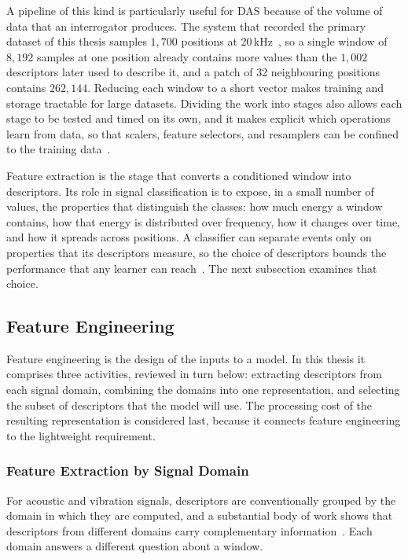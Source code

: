 A pipeline of this kind is particularly useful for DAS because of the volume of data that an interrogator produces. The system that recorded the primary dataset of this thesis samples $1{,}700$ positions at 20\,kHz~\cite{tomasov2025dataset}, so a single window of $8{,}192$ samples at one position already contains more values than the $1{,}002$ descriptors later used to describe it, and a patch of 32 neighbouring positions contains $262{,}144$. Reducing each window to a short vector makes training and storage tractable for large datasets. Dividing the work into stages also allows each stage to be tested and timed on its own, and it makes explicit which operations learn from data, so that scalers, feature selectors, and resamplers can be confined to the training data~\cite{kapoor2023leakage}.

Feature extraction is the stage that converts a conditioned window into descriptors. Its role in signal classification is to expose, in a small number of values, the properties that distinguish the classes: how much energy a window contains, how that energy is distributed over frequency, how it changes over time, and how it spreads across positions. A classifier can separate events only on properties that its descriptors measure, so the choice of descriptors bounds the performance that any learner can reach~\cite{guyon2003variable,sharma2020audio}. The next subsection examines that choice.

\subsection{Feature Engineering}
\label{sec:chap2FeatureEngineering}
Feature engineering is the design of the inputs to a model. In this thesis it comprises three activities, reviewed in turn below: extracting descriptors from each signal domain, combining the domains into one representation, and selecting the subset of descriptors that the model will use. The processing cost of the resulting representation is considered last, because it connects feature engineering to the lightweight requirement.

\subsubsection{Feature Extraction by Signal Domain}
\label{sec:chap2FeatureExtraction}
For acoustic and vibration signals, descriptors are conventionally grouped by the domain in which they are computed, and a substantial body of work shows that descriptors from different domains carry complementary information~\cite{sharma2020audio}. Each domain answers a different question about a window.

